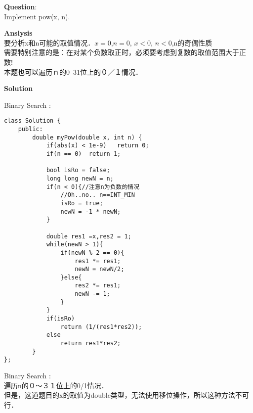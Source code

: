     
\begin{description}
    \item{\textbf{Question}}:\\%
		Implement pow(x, n).\\

    \item{\textbf{Anslysis}}\\
		要分析x和n可能的取值情况．$x=0$,$n=0$, $x<0$, $n<0$,n的奇偶性质\\
		需要特别注意的是：在对某个负数取正时，必须要考虑到复数的取值范围大于正数!\\
		本题也可以遍历ｎ的0~31位上的０／１情况．\\

    \item{\textbf{Solution}}\\
	\item{Binary Search} : \\
		\begin{lstlisting}
class Solution {
	public:
		double myPow(double x, int n) {
			if(abs(x) < 1e-9)	return 0;
			if(n == 0)	return 1;

			bool isRo = false;
			long long newN = n;
			if(n < 0){//注意n为负数的情况
				//Oh..no.. n==INT_MIN
				isRo = true;	
				newN = -1 * newN;
			}

			double res1 =x,res2 = 1;
			while(newN > 1){
				if(newN % 2 == 0){
					res1 *= res1;
					newN = newN/2;
				}else{
					res2 *= res1;
					newN -= 1;
				}
			}
			if(isRo)
				return (1/(res1*res2));
			else
				return res1*res2;
		}
};		\end{lstlisting}

	\item{Binary Search} : \\
		遍历n的０～３１位上的0/1情况．\\
		但是，这道题目的x的取值为double类型，无法使用移位操作，所以这种方法不可行．\\
\end{description}

